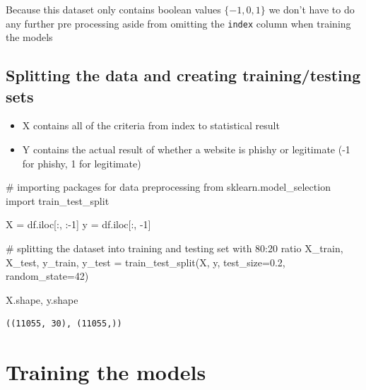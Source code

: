 \documentclass[
  letterpaper,
  DIV=11,
  numbers=noendperiod]{scrartcl}
\newenvironment{Shaded}{\begin{snugshade}}{\end{snugshade}}
\newcommand{\CommentTok}[1]{\textcolor[rgb]{0.37,0.37,0.37}{#1}}
\newcommand{\DecValTok}[1]{\textcolor[rgb]{0.68,0.00,0.00}{#1}}
\newcommand{\FloatTok}[1]{\textcolor[rgb]{0.68,0.00,0.00}{#1}}
\newcommand{\ImportTok}[1]{\textcolor[rgb]{0.00,0.46,0.62}{#1}}
\newcommand{\NormalTok}[1]{\textcolor[rgb]{0.00,0.23,0.31}{#1}}
\newcommand{\OperatorTok}[1]{\textcolor[rgb]{0.37,0.37,0.37}{#1}}
\providecommand{\tightlist}{%
  \setlength{\itemsep}{0pt}\setlength{\parskip}{0pt}}\usepackage{longtable,booktabs,array}
\begin{document}
Because this dataset only contains boolean values \(\{-1, 0, 1\}\) we
don't have to do any further pre processing aside from omitting the
\texttt{index} column when training the models

\hypertarget{splitting-the-data-and-creating-trainingtesting-sets}{%
\subsection{Splitting the data and creating training/testing
sets}\label{splitting-the-data-and-creating-trainingtesting-sets}}

\begin{itemize}
\tightlist
\item
  X contains all of the criteria from index to statistical result
\item
  Y contains the actual result of whether a website is phishy or
  legitimate (-1 for phishy, 1 for legitimate)
\end{itemize}

\begin{Shaded}
\begin{Highlighting}[]
\CommentTok{\# importing packages for data preprocessing}
\ImportTok{from}\NormalTok{ sklearn.model\_selection }\ImportTok{import}\NormalTok{ train\_test\_split}

\NormalTok{X }\OperatorTok{=}\NormalTok{ df.iloc[:, :}\OperatorTok{{-}}\DecValTok{1}\NormalTok{]}
\NormalTok{y }\OperatorTok{=}\NormalTok{ df.iloc[:, }\OperatorTok{{-}}\DecValTok{1}\NormalTok{]}

\CommentTok{\# splitting the dataset into training and testing set with 80:20 ratio}
\NormalTok{X\_train, X\_test, y\_train, y\_test }\OperatorTok{=}\NormalTok{ train\_test\_split(X, y, test\_size}\OperatorTok{=}\FloatTok{0.2}\NormalTok{, random\_state}\OperatorTok{=}\DecValTok{42}\NormalTok{)}

\NormalTok{X.shape, y.shape}
\end{Highlighting}
\end{Shaded}

\begin{verbatim}
((11055, 30), (11055,))
\end{verbatim}

\hypertarget{training-the-models}{%
\section{Training the models}\label{training-the-models}}
\end{document}
